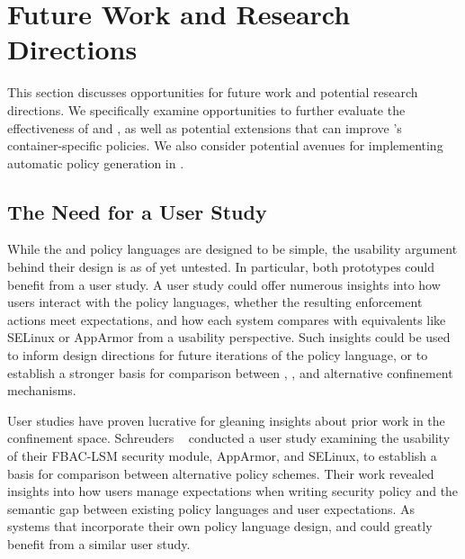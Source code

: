 \section{Future Work and Research Directions}%
\label{s:disc-future-work}

This section discusses opportunities for future work and potential research directions.
We specifically examine opportunities to further evaluate the effectiveness of \bpfbox{}
and \bpfcontain{}, as well as potential extensions that can improve \bpfcontain{}'s
container-specific policies. We also consider potential avenues for implementing automatic
policy generation in \bpfcontain{}.

\subsection{The Need for a User Study}
\label{ss:disc-user-study}

While the \bpfbox{} and \bpfcontain{} policy languages are designed to be simple, the
usability argument behind their design is as of yet untested. In particular, both
prototypes could benefit from a user study. A user study could offer numerous insights
into how users interact with the policy languages, whether the resulting enforcement
actions meet expectations, and how each system compares with equivalents like SELinux or
AppArmor from a usability perspective. Such insights could be used to inform design
directions for future iterations of the policy language, or to establish a stronger basis
for comparison between \bpfbox{}, \bpfcontain{}, and alternative confinement mechanisms.

User studies have proven lucrative for gleaning insights about prior work in the
confinement space. Schreuders \etal~\cite{schreuders2012_towards} conducted a user study
examining the usability of their FBAC-LSM security module, AppArmor, and SELinux, to
establish a basis for comparison between alternative policy schemes. Their work revealed
insights into how users manage expectations when writing security policy and the semantic
gap between existing policy languages and user expectations. As systems that incorporate
their own policy language design, \bpfbox{} and \bpfcontain{} could greatly benefit from
a similar user study.

